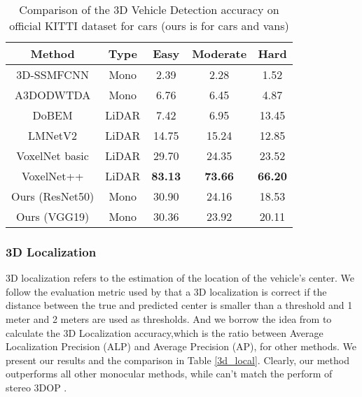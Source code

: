 \begin{table}[H]
	\centering
	\caption{Comparison of the 3D Vehicle Detection accuracy on official KITTI dataset for cars (ours is for cars and vans)}
	\label{3D_vehicle_detection}
	\begin{tabular}{|c|c|c|c|c|}
		\hline
		Method                                                                   & Type  & Easy           & Moderate       & Hard           \\ \hline
		3D-SSMFCNN \cite{novakmaster2017}                       & Mono  & 2.39           & 2.28           & 1.52           \\ \hline
		A3DODWTDA \cite{erino397fregu856master2018}             & Mono  & 6.76           & 6.45           & 4.87           \\ \hline
		DoBEM \cite{8088147}                                    & LiDAR & 7.42           & 6.95           & 13.45          \\ \hline
		LMNetV2 \cite{2018arXiv180504902M}                      & LiDAR & 14.75          & 15.24          & 12.85          \\ \hline
		VoxelNet basic \cite{DBLP:journals/corr/abs-1711-06396} & LiDAR & 29.70          & 24.35          & 23.52          \\ \hline
		VoxelNet++ \cite{DBLP:journals/corr/abs-1711-06396}     & LiDAR & \textbf{83.13} & \textbf{73.66} & \textbf{66.20} \\ \hline
		Ours (ResNet50)                                                          & Mono  & 30.90          & 24.16          & 18.53          \\ \hline
		Ours (VGG19)																& Mono	& 30.36	& 23.92	& 20.11 \\ \hline
		
	\end{tabular}
\end{table}


\subsubsection{3D Localization}
3D localization refers to the estimation of the location of the vehicle's center. We follow the evaluation metric used by \cite{DBLP:journals/corr/MousavianAFK16, DBLP:journals/corr/ChabotCRTC17} that a 3D localization is correct if the distance between the true and predicted center is smaller than a threshold and 1 meter and 2 meters are used as thresholds. And we borrow the idea from \cite{DBLP:journals/corr/MousavianAFK16} to calculate the 3D Localization accuracy,which is the ratio between Average Localization Precision (ALP) and Average Precision (AP), for other methods. We present our results and the comparison in Table \ref{3d_local}. Clearly, our method outperforms all other monocular methods, while can't match the perform of stereo 3DOP \cite{Chen:2015:OPA:2969239.2969287}.

